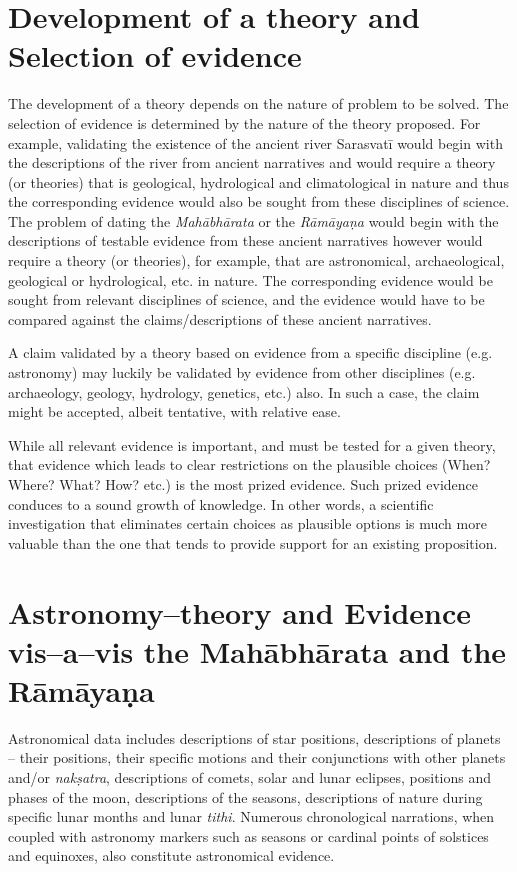 \section*{Development of a theory and Selection of evidence}

The development of a theory depends on the nature of problem to be solved. The selection of evidence is determined by the nature of the theory proposed. For example, validating the existence of the ancient river Sarasvatī would begin with the descriptions of the river from ancient narratives and would require a theory (or theories) that is geological, hydrological and climatological in nature and thus the corresponding evidence would also be sought from these disciplines of science. The problem of dating the \textit{Mahābhārata} or the \textit{Rāmāyaṇa} would begin with the descriptions of testable evidence from these ancient narratives however would require a theory (or theories), for example, that are astronomical, archaeological, geological or hydrological, etc. in nature. The corresponding evidence would be sought from relevant disciplines of science, and the evidence would have to be compared against the claims/descriptions of these ancient narratives.

A claim validated by a theory based on evidence from a specific discipline (e.g. astronomy) may luckily be validated by evidence from other disciplines (e.g. archaeology, geology, hydrology, genetics, etc.) also. In such a case, the claim might be accepted, albeit tentative, with relative ease.

While all relevant evidence is important, and must be tested for a given theory, that evidence which leads to clear restrictions on the plausible choices (When? Where? What? How? etc.) is the most prized evidence. Such prized evidence conduces to a sound growth of knowledge. In other words, a scientific investigation that eliminates certain choices as plausible options is much more valuable than the one that tends to provide support for an existing proposition.


\section*{Astronomy–theory and Evidence vis–a–vis the Mahābhārata and the Rāmāyaṇa}

Astronomical data includes descriptions of star positions, descriptions of planets – their positions, their specific motions and their conjunctions with other planets and/or \textit{nakṣatra}, descriptions of comets, solar and lunar eclipses, positions and phases of the moon, descriptions of the seasons, descriptions of nature during specific lunar months and lunar \textit{tithi}. Numerous chronological narrations, when coupled with astronomy markers such as seasons or cardinal points of solstices and equinoxes, also constitute astronomical evidence.

